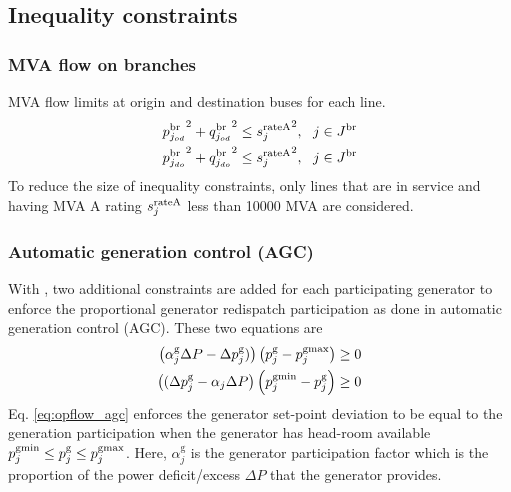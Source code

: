 \subsection{Inequality constraints}

\subsubsection{MVA flow on branches}
MVA flow limits at origin and destination buses for each line.
\begin{align}
  {p^\text{br}_{j_{od}}}^2 + {q^\text{br}_{j_{od}}}^2 \le {s^{\text{rateA}}_j}^2,~~j \in J^\text{br}\\
  {p^\text{br}_{j_{do}}}^2 + {q^\text{br}_{j_{do}}}^2 \le {s^{\text{rateA}}_j}^2,~~j \in J^\text{br}
\end{align}
To reduce the size of inequality constraints, only lines that are in service and having MVA A rating $s^{\text{rateA}}_j$ less than 10000 MVA are considered.

\subsubsection{Automatic generation control (AGC)}
With \option{\opflowuseagc}, two additional constraints are added for each participating generator to enforce the proportional generator redispatch participation as done in automatic generation control (AGC). These two equations are 
\begin{equation}
\begin{aligned}
  \left(\alpha^{\text{g}}_j\Delta{P} - \Delta{p}^\text{g}_j)\right)\left(p^\text{g}_j - p^\text{gmax}_j\right) \ge 0 \\
  \left((\Delta{p}^\text{g}_j - \alpha_j\Delta{P}\right)\left(p^\text{gmin}_j - p^\text{g}_j\right) \ge 0
\end{aligned}
\label{eq:opflow_agc}
\end{equation}
Eq. \ref{eq:opflow_agc} enforces the generator set-point deviation to be equal to the generation participation when the generator has head-room available $p^\text{gmin}_j \le p^\text{g}_j \le p^\text{gmax}_j$. Here, $\alpha^{\text{g}}_j$ is the generator participation factor which is the proportion of the power deficit/excess $\Delta{P}$ that the generator provides.

